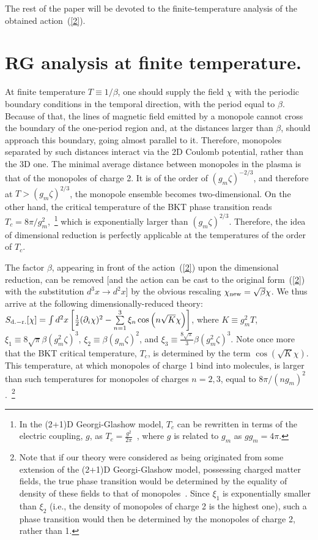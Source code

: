 \documentclass[a4paper,12pt]{article}
\begin{document}
The rest of the paper will be devoted to the finite-temperature analysis of the obtained action~(\ref{2}).





\section{RG analysis at finite temperature.}
At finite temperature $T\equiv1/\beta$, one should supply the field $\chi$
with the periodic boundary conditions in the temporal direction, with the period equal to
$\beta$. Because of that, the lines of magnetic field emitted by a monopole cannot cross
the boundary of the one-period region and, at the distances larger than $\beta$,
should approach this boundary, going almost parallel to it.
Therefore, monopoles separated by such distances
interact via the 2D Coulomb potential, rather than the 3D one. The minimal average distance
between monopoles in the plasma is that of the monopoles of charge 2. It is of the order of $(g_m\zeta)^{-2/3}$,
and therefore at $T>(g_m\zeta)^{2/3}$,
the monopole ensemble becomes two-dimensional. On the other hand, the critical temperature of the BKT phase transition
reads $T_c=8\pi/g_m^2$,~\footnote{In the (2+1)D Georgi-Glashow model, $T_c$ can be rewritten in terms of the
electric coupling, $g$, as $T_c=\frac{g^2}{2\pi}$~\cite{nk}, where $g$ is related to $g_m$ as $gg_m=4\pi$.}
which is exponentially larger than $(g_m\zeta)^{2/3}$.
Therefore, the idea of dimensional reduction is perfectly applicable
at the temperatures of the order of $T_c$.

The factor $\beta$, appearing in front of the
action~(\ref{2}) upon the dimensional reduction,
can be removed [and the action can be cast to the original form~(\ref{2}) with the substitution $d^3x\to d^2x$]
by the obvious rescaling $\chi_{\rm new}=\sqrt{\beta}\chi$. We thus arrive at the following dimensionally-reduced theory:
$S_{\rm d.-r.}[\chi]=\int d^2x\left[\frac12(\partial_i\chi)^2-\sum\limits_{n=1}^{3}\xi_n\cos\left(n\sqrt{K}\chi\right)\right]$,
where $K\equiv g_m^2T$, $\xi_1\equiv8\sqrt{\pi}\beta(g_m^2\zeta)^3$, $\xi_2\equiv\beta(g_m\zeta)^2$, and
$\xi_3\equiv\frac{8\sqrt{\pi}}{3}\beta(g_m^2\zeta)^3$. Note once more that the BKT critical temperature, $T_c$, is determined
by the term $\cos\left(\sqrt{K}\chi\right)$. This temperature, at which monopoles of charge 1 bind into molecules,
is larger than such temperatures for monopoles of charges $n=2,3$, equal to $8\pi/(ng_m)^2$.~\footnote{
Note that if our theory were considered as being originated from some extension of the (2+1)D Georgi-Glashow model,
possessing charged matter fields, the true phase transition would be determined by the equality of density of these
fields to that of monopoles~\cite{2}.
Since $\xi_1$ is exponentially smaller than $\xi_2$ (i.e., the density of monopoles of charge 2
is the highest one), such a phase transition would then be determined by the
monopoles of charge 2, rather than 1.}
\end{document}
